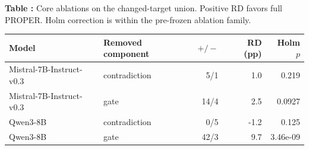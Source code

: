 \begin{center}
\label{tab:ablations}
\textbf{Table \thetable:} Core ablations on the changed-target union. Positive RD favors full PROPER. Holm correction is within the pre-frozen ablation family.\par\smallskip
\small
\begin{tabular}{llrrr}
\toprule
Model & Removed component & $+/-$ & RD (pp) & Holm $p$ \\
\midrule
Mistral-7B-Instruct-v0.3 & contradiction & 5/1 & 1.0 & 0.219 \\
Mistral-7B-Instruct-v0.3 & gate & 14/4 & 2.5 & 0.0927 \\
Qwen3-8B & contradiction & 0/5 & -1.2 & 0.125 \\
Qwen3-8B & gate & 42/3 & 9.7 & 3.46e-09 \\
\bottomrule
\end{tabular}
\end{center}
